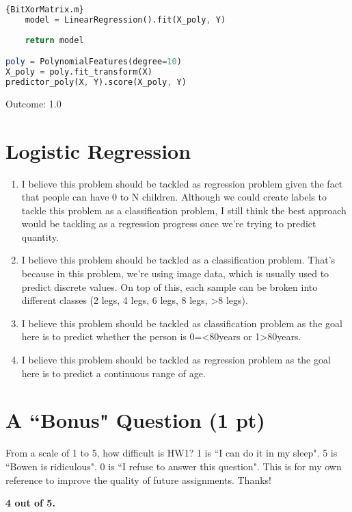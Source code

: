 \documentclass{assignment}
\begin{document}
\begin{problem}
\begin{enumerate}[label=\alph*)]
\begin{lstlisting}[language=Octave]{BitXorMatrix.m}
    model = LinearRegression().fit(X_poly, Y)
    
    return model

poly = PolynomialFeatures(degree=10)
X_poly = poly.fit_transform(X)
predictor_poly(X, Y).score(X_poly, Y)
\end{lstlisting}
Outcome: 1.0
\end{enumerate}

\section{Logistic Regression}
\begin{enumerate}[label=\alph*)] 
    \item 
    I believe this problem should be tackled as regression problem given the fact that people can have 0 to N children. Although we could create labels to tackle this problem as a classification problem, I still think the best approach would be tackling as a regression progress once we're trying to predict quantity.

    \item
    I believe this problem should be tackled as a classification problem. That's because in this problem, we're using image data, which is usually used to predict discrete values. On top of this, each sample can be broken into different classes (2 legs, 4 legs, 6 legs, 8 legs, >8 legs).

    \item 
    I believe this problem should be tackled as classification problem as the goal here is to predict whether the person is 0=<80years or 1>80years.

    \item
    I believe this problem should be tackled as regression problem as the goal here is to predict a continuous range of age.
\end{enumerate}
    

\section{A ``Bonus" Question (1 pt)}
\noindent From a scale of 1 to 5, how difficult is HW1? 1 is ``I can do it in my sleep". 5 is ``Bowen is ridiculous". 0 is ``I refuse to answer this question". This is for my own reference to improve the quality of future assignments. Thanks!

\textbf{4 out of 5.}
    
\end{problem}
\end{document}
